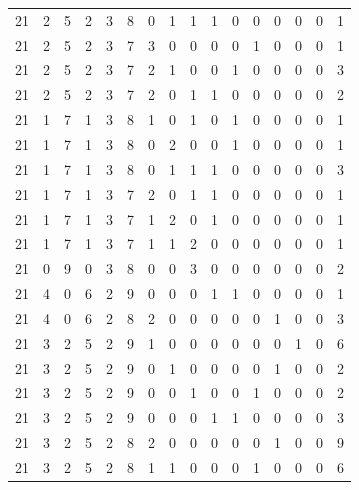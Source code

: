 \begin{appendix}
{\begin{longtable}{lrrrrrrrrrrrrrrr}
    21        & 2  & 5  & 2  & 3  & 8  & 0  & 1  & 1  & 1  & 0  & 0  & 0   & 0   & 0   & 1    \\
    21        & 2  & 5  & 2  & 3  & 7  & 3  & 0  & 0  & 0  & 0  & 1  & 0   & 0   & 0   & 1    \\
    21        & 2  & 5  & 2  & 3  & 7  & 2  & 1  & 0  & 0  & 1  & 0  & 0   & 0   & 0   & 3    \\
    21        & 2  & 5  & 2  & 3  & 7  & 2  & 0  & 1  & 1  & 0  & 0  & 0   & 0   & 0   & 2    \\
    21        & 1  & 7  & 1  & 3  & 8  & 1  & 0  & 1  & 0  & 1  & 0  & 0   & 0   & 0   & 1    \\
    21        & 1  & 7  & 1  & 3  & 8  & 0  & 2  & 0  & 0  & 1  & 0  & 0   & 0   & 0   & 1    \\
    21        & 1  & 7  & 1  & 3  & 8  & 0  & 1  & 1  & 1  & 0  & 0  & 0   & 0   & 0   & 3    \\
    21        & 1  & 7  & 1  & 3  & 7  & 2  & 0  & 1  & 1  & 0  & 0  & 0   & 0   & 0   & 1    \\
    21        & 1  & 7  & 1  & 3  & 7  & 1  & 2  & 0  & 1  & 0  & 0  & 0   & 0   & 0   & 1    \\
    21        & 1  & 7  & 1  & 3  & 7  & 1  & 1  & 2  & 0  & 0  & 0  & 0   & 0   & 0   & 1    \\
    21        & 0  & 9  & 0  & 3  & 8  & 0  & 0  & 3  & 0  & 0  & 0  & 0   & 0   & 0   & 2    \\
    21        & 4  & 0  & 6  & 2  & 9  & 0  & 0  & 0  & 1  & 1  & 0  & 0   & 0   & 0   & 1    \\
    21        & 4  & 0  & 6  & 2  & 8  & 2  & 0  & 0  & 0  & 0  & 0  & 1   & 0   & 0   & 3    \\
    21        & 3  & 2  & 5  & 2  & 9  & 1  & 0  & 0  & 0  & 0  & 0  & 0   & 1   & 0   & 6    \\
    21        & 3  & 2  & 5  & 2  & 9  & 0  & 1  & 0  & 0  & 0  & 0  & 1   & 0   & 0   & 2    \\
    21        & 3  & 2  & 5  & 2  & 9  & 0  & 0  & 1  & 0  & 0  & 1  & 0   & 0   & 0   & 2    \\
    21        & 3  & 2  & 5  & 2  & 9  & 0  & 0  & 0  & 1  & 1  & 0  & 0   & 0   & 0   & 3    \\
    21        & 3  & 2  & 5  & 2  & 8  & 2  & 0  & 0  & 0  & 0  & 0  & 1   & 0   & 0   & 9    \\
    21        & 3  & 2  & 5  & 2  & 8  & 1  & 1  & 0  & 0  & 0  & 1  & 0   & 0   & 0   & 6    \\

\end{longtable}}
\end{appendix}
